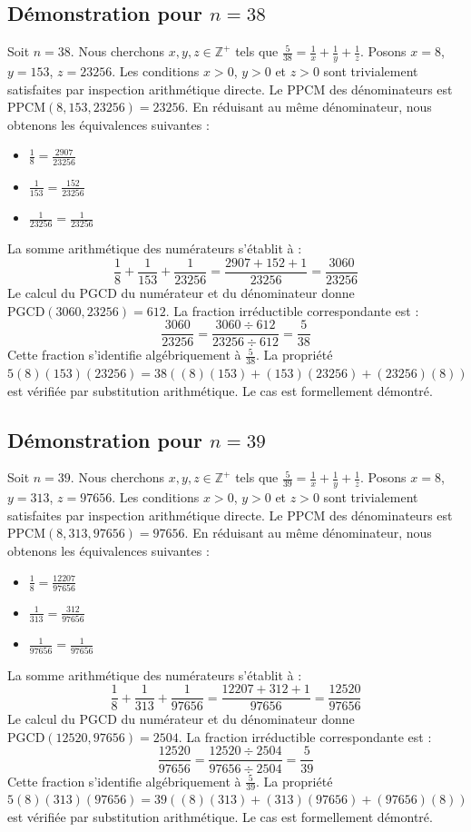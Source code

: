 \documentclass[12pt,a4paper]{article}
\begin{document}
\subsection{Démonstration pour $n = 38$}
Soit $n = 38$. Nous cherchons $x, y, z \in \mathbb{Z}^{+}$ tels que $\frac{5}{38} = \frac{1}{x} + \frac{1}{y} + \frac{1}{z}$.
Posons $x = 8$, $y = 153$, $z = 23256$.
Les conditions $x > 0$, $y > 0$ et $z > 0$ sont trivialement satisfaites par inspection arithmétique directe.
Le PPCM des dénominateurs est $\text{PPCM}(8, 153, 23256) = 23256$.
En réduisant au même dénominateur, nous obtenons les équivalences suivantes :
\begin{itemize}
    \item $\frac{1}{8} = \frac{2907}{23256}$
    \item $\frac{1}{153} = \frac{152}{23256}$
    \item $\frac{1}{23256} = \frac{1}{23256}$
\end{itemize}
La somme arithmétique des numérateurs s'établit à :
$$ \frac{1}{8} + \frac{1}{153} + \frac{1}{23256} = \frac{2907 + 152 + 1}{23256} = \frac{3060}{23256} $$
Le calcul du PGCD du numérateur et du dénominateur donne $\text{PGCD}(3060, 23256) = 612$.
La fraction irréductible correspondante est :
$$ \frac{3060}{23256} = \frac{3060 \div 612}{23256 \div 612} = \frac{5}{38} $$
Cette fraction s'identifie algébriquement à $\frac{5}{38}$.
La propriété $5(8)(153)(23256) = 38((8)(153) + (153)(23256) + (23256)(8))$ est vérifiée par substitution arithmétique.
Le cas est formellement démontré.

\subsection{Démonstration pour $n = 39$}
Soit $n = 39$. Nous cherchons $x, y, z \in \mathbb{Z}^{+}$ tels que $\frac{5}{39} = \frac{1}{x} + \frac{1}{y} + \frac{1}{z}$.
Posons $x = 8$, $y = 313$, $z = 97656$.
Les conditions $x > 0$, $y > 0$ et $z > 0$ sont trivialement satisfaites par inspection arithmétique directe.
Le PPCM des dénominateurs est $\text{PPCM}(8, 313, 97656) = 97656$.
En réduisant au même dénominateur, nous obtenons les équivalences suivantes :
\begin{itemize}
    \item $\frac{1}{8} = \frac{12207}{97656}$
    \item $\frac{1}{313} = \frac{312}{97656}$
    \item $\frac{1}{97656} = \frac{1}{97656}$
\end{itemize}
La somme arithmétique des numérateurs s'établit à :
$$ \frac{1}{8} + \frac{1}{313} + \frac{1}{97656} = \frac{12207 + 312 + 1}{97656} = \frac{12520}{97656} $$
Le calcul du PGCD du numérateur et du dénominateur donne $\text{PGCD}(12520, 97656) = 2504$.
La fraction irréductible correspondante est :
$$ \frac{12520}{97656} = \frac{12520 \div 2504}{97656 \div 2504} = \frac{5}{39} $$
Cette fraction s'identifie algébriquement à $\frac{5}{39}$.
La propriété $5(8)(313)(97656) = 39((8)(313) + (313)(97656) + (97656)(8))$ est vérifiée par substitution arithmétique.
Le cas est formellement démontré.
\end{document}
